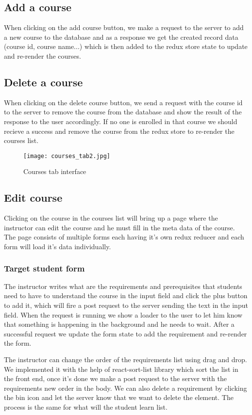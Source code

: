 \subsection{Add a course}
When clicking on the add course button, we make a request to the server to add a new course to the database and as a response we get the created record data (course id, course name...) which is then added to the redux store state to update and re-render the courses.

\subsection{Delete a course}
When clicking on the delete course button, we send a request with the course id to the server to remove the course from the database and show the result of the response to the user accordingly. If no one is enrolled in that course we should recieve a success and remove the course from the redux store to re-render the courses list. 

\begin{figure}[!ht]
    \centering
    \texttt{[image: courses\_tab2.jpg]}
    \caption{Courses tab interface}
    \label{fig:courses_tab2}
\end{figure}

\subsection{Edit course}
Clicking on the course in the courses list will bring up a page where the instructor can edit the course and he must fill in the meta data of the course. The page consists of multiple forms each having it's own redux reducer and each form will load it's data individually.

\subsubsection{Target student form}
The instructor writes what are the requirements and prerequisites that students need to have to understand the course in the input field and click the plus button to add it, which will fire a post request to the server sending the text in the input field. When the request is running we show a loader to the user to let him know that something is happening in the background and he needs to wait. After a successful request we update the form state to add the requirement and re-render the form.

\hfill \break
\hfill \break
The instructor can change the order of the requirements list using drag and drop. We implemented it with the help of react-sort-list library which sort the list in the front end, once it's done we make a post request to the server with the requirements new order in the body.
\hfill \break
\hfill \break
We can also delete a requirement by clicking the bin icon and let the server know that we want to delete the element.
\hfill \break
\hfill \break
The process is the same for what will the student learn list.

